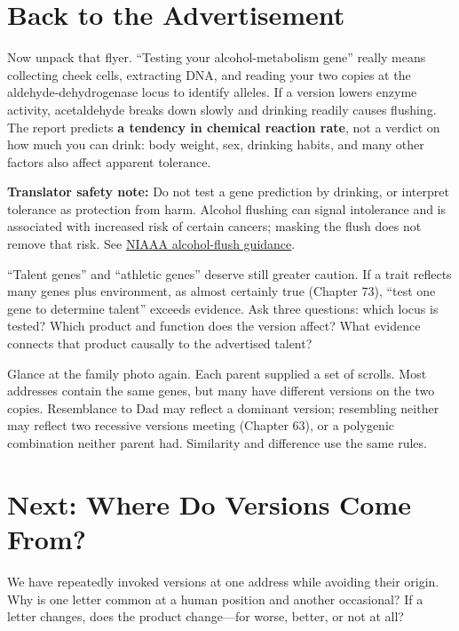 \section{Back to the Advertisement}

Now unpack that flyer. ``Testing your alcohol-metabolism gene'' really means collecting cheek cells, extracting DNA, and reading your two copies at the aldehyde-dehydrogenase locus to identify alleles. If a version lowers enzyme activity, acetaldehyde breaks down slowly and drinking readily causes flushing. The report predicts \textbf{a tendency in chemical reaction rate}, not a verdict on how much you can drink: body weight, sex, drinking habits, and many other factors also affect apparent tolerance.

\textbf{Translator safety note:} Do not test a gene prediction by drinking, or interpret tolerance as protection from harm. Alcohol flushing can signal intolerance and is associated with increased risk of certain cancers; masking the flush does not remove that risk. See \href{https://www.niaaa.nih.gov/publications/alcohol-flush-reaction-does-drinking-alcohol-make-your-face-red}{NIAAA alcohol-flush guidance}.

``Talent genes'' and ``athletic genes'' deserve still greater caution. If a trait reflects many genes plus environment, as almost certainly true (Chapter 73), ``test one gene to determine talent'' exceeds evidence. Ask three questions: which locus is tested? Which product and function does the version affect? What evidence connects that product causally to the advertised talent?

Glance at the family photo again. Each parent supplied a set of scrolls. Most addresses contain the same genes, but many have different versions on the two copies. Resemblance to Dad may reflect a dominant version; resembling neither may reflect two recessive versions meeting (Chapter 63), or a polygenic combination neither parent had. Similarity and difference use the same rules.

\section{Next: Where Do Versions Come From?}

We have repeatedly invoked versions at one address while avoiding their origin. Why is one letter common at a human position and another occasional? If a letter changes, does the product change---for worse, better, or not at all?

